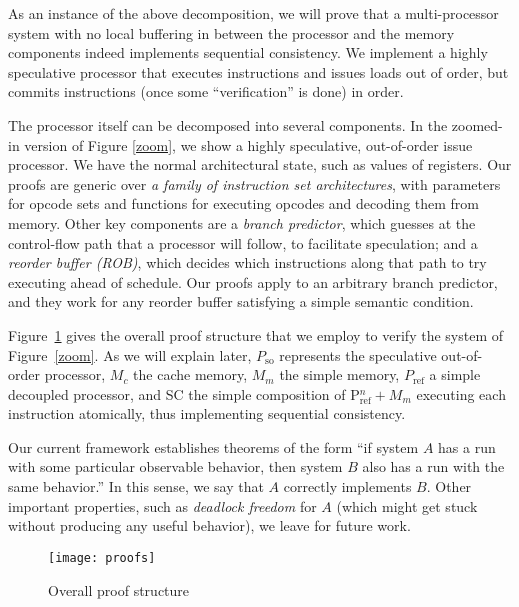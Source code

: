 As an instance of the above decomposition, we will prove that a multi-processor
system with no local buffering in between the processor and the memory
components indeed implements sequential consistency. We implement a highly
speculative processor that executes instructions and issues loads out of
order, but commits instructions (once some ``verification'' is done) in order.

The processor itself can be decomposed into several components. In the zoomed-in
version of Figure \ref{zoom}, we show a highly speculative, out-of-order
issue processor. We have the normal architectural state, such as values of
registers.  Our proofs are generic over \emph{a family of instruction set
architectures}, with parameters for opcode sets and functions for executing
opcodes and decoding them from memory.  Other key components are a \emph{branch
predictor}, which guesses at the control-flow path that a processor will
follow, to facilitate speculation; and a \emph{reorder buffer (ROB)}, which
decides which instructions along that path to try executing ahead of schedule.
Our proofs apply to an arbitrary branch predictor, and they work for any
reorder buffer satisfying a simple semantic condition.

Figure~\ref{proofs} gives the overall proof structure that we employ to verify
the system of Figure~\ref{zoom}. As we will explain later, $P_\text{so}$
represents the speculative out-of-order processor, $M_c$ the cache memory,
$M_m$ the simple memory, $P_\text{ref}$ a simple decoupled processor, and
SC the simple composition of P$^n_\text{ref}+ M_m$ executing each
instruction atomically, thus implementing sequential consistency.

Our current framework establishes theorems of the form ``if system $A$ has a run
with some particular observable behavior, then system $B$ also has a run with
the same behavior.''  In this sense, we say that $A$ correctly implements $B$.
Other important properties, such as \emph{deadlock freedom} for $A$ (which
might get stuck without producing any useful behavior), we leave for future
work.

\begin{figure}
\texttt{[image: proofs]}
\caption{Overall proof structure}
\label{proofs}
\end{figure}

